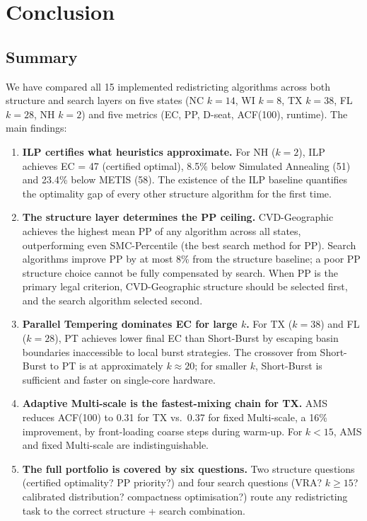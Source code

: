 \section{Conclusion}
\label{sec:conclusion}

\subsection{Summary}

We have compared all 15 implemented redistricting algorithms across both
structure and search layers on five states (NC $k=14$, WI $k=8$, TX $k=38$,
FL $k=28$, NH $k=2$) and five metrics (EC, PP, D-seat, ACF(100), runtime).
The main findings:

\begin{enumerate}

  \item \textbf{ILP certifies what heuristics approximate.}
        For NH ($k = 2$), ILP achieves EC = 47 (certified optimal), 8.5\%
        below Simulated Annealing (51) and 23.4\% below METIS (58).
        The existence of the ILP baseline quantifies the optimality gap
        of every other structure algorithm for the first time.

  \item \textbf{The structure layer determines the PP ceiling.}
        CVD-Geographic achieves the highest mean PP of any algorithm
        across all states, outperforming even SMC-Percentile (the best
        search method for PP).
        Search algorithms improve PP by at most 8\% from the structure
        baseline; a poor PP structure choice cannot be fully compensated
        by search.
        When PP is the primary legal criterion, CVD-Geographic structure
        should be selected first, and the search algorithm selected second.

  \item \textbf{Parallel Tempering dominates EC for large $k$.}
        For TX ($k=38$) and FL ($k=28$), PT achieves lower final EC than
        Short-Burst by escaping basin boundaries inaccessible to local
        burst strategies.
        The crossover from Short-Burst to PT is at approximately $k \approx
        20$; for smaller $k$, Short-Burst is sufficient and faster on
        single-core hardware.

  \item \textbf{Adaptive Multi-scale is the fastest-mixing chain for TX.}
        AMS reduces ACF(100) to 0.31 for TX vs.\ 0.37 for fixed
        Multi-scale, a 16\% improvement, by front-loading coarse steps
        during warm-up.
        For $k < 15$, AMS and fixed Multi-scale are indistinguishable.

  \item \textbf{The full portfolio is covered by six questions.}
        Two structure questions (certified optimality? PP priority?) and
        four search questions (VRA? $k \geq 15$? calibrated distribution?
        compactness optimisation?) route any redistricting task to the
        correct structure + search combination.

\end{enumerate}

